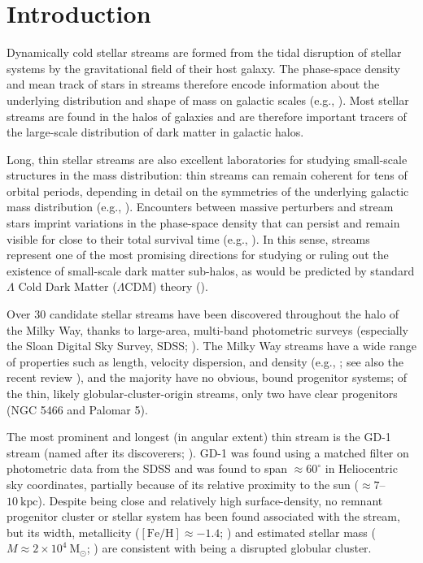 \documentclass[modern]{aastex62}
\newcommand{\msun}{\textrm{M}_\odot}
\newcommand{\feh}{\ensuremath{[\textrm{Fe} / \textrm{H}]}}
\begin{document}
\section{Introduction}
\label{sec:intro}

Dynamically cold stellar streams are formed from the tidal disruption of stellar
systems by the gravitational field of their host galaxy.
The phase-space density and mean track of stars in streams therefore encode
information about the underlying distribution and shape of mass on galactic
scales (e.g., \citealt{Johnston:1999, Bonaca:2018}).
Most stellar streams are found in the halos of galaxies and are therefore
important tracers of the large-scale distribution of dark matter in galactic
halos.

Long, thin stellar streams are also excellent laboratories for studying
small-scale structures in the mass distribution:
thin streams can remain coherent for tens of orbital periods, depending in
detail on the symmetries of the underlying galactic mass distribution (e.g.,
\citealt{Erkal:2016a}).
Encounters between massive perturbers and stream stars imprint variations in the
phase-space density that can persist and remain visible for close to their total
survival time (e.g., \citealt{Yoon:2011}).
In this sense, streams represent one of the most promising directions for
studying or ruling out the existence of small-scale dark matter sub-halos, as
would be predicted by standard $\Lambda$ Cold Dark Matter ($\Lambda$CDM) theory
(\citealt{Erkal:2015, Sanders:2016, Bovy:2017}).

Over 30 candidate stellar streams have been discovered throughout the halo of
the Milky Way, thanks to large-area, multi-band photometric surveys (especially
the Sloan Digital Sky Survey, SDSS; \citealt{York:2000}).
The Milky Way streams have a wide range of properties such as length, velocity
dispersion, and density (e.g., \citealt{Odenkirchen:2001, Grillmair:2006,
Grillmair:2006b, Belokurov:2006, Belokurov:2007, Bonaca:2012, Shipp:2018}; see
also the recent review \citealt{Grillmair:2016, Newberg:2016}), and the majority
have no obvious, bound progenitor systems;
of the thin, likely globular-cluster-origin streams, only two have clear
progenitors (NGC 5466 and Palomar 5).

The most prominent and longest (in angular extent) thin stream is the GD-1
stream (named after its discoverers; \citealt{Grillmair:2006}).
GD-1 was found using a matched filter on photometric data from the SDSS and
was found to span $\approx 60^\circ$ in Heliocentric sky coordinates, partially
because of its relative proximity to the sun ($\approx 7$--$10~\textrm{kpc}$).
Despite being close and relatively high surface-density, no remnant progenitor
cluster or stellar system has been found associated with the stream, but its
width,  metallicity ($\feh \approx -1.4$; \citealt{Koposov:2010}) and estimated
stellar mass ($M \approx 2 \times 10^4~\msun$; \citealt{Koposov:2010}) are
consistent with being a disrupted globular cluster.
\end{document}
